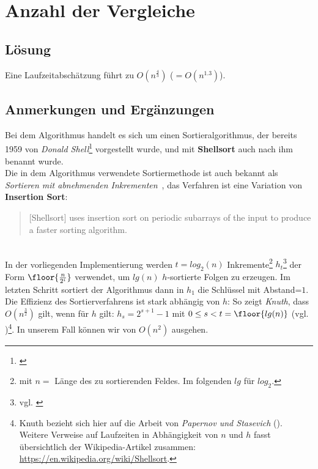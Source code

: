 \chapter{Anzahl der Vergleiche}

\section*{Lösung}

Eine Laufzeitabschätzung führt zu $O(n^{\frac{4}{3}})$ ($ = O(n^{1.3})$).


\section*{Anmerkungen und Ergänzungen}

Bei dem Algorithmus handelt es sich um einen Sortieralgorithmus, der bereits 1959 von \textit{Donald Shell}\footnote{
\cite[]{She59}
} vorgestellt wurde, und mit \textbf{Shellsort} auch nach ihm benannt wurde.\\

Die in dem Algorithmus verwendete Sortiermethode ist auch bekannt als \textit{Sortieren mit abnehmenden Inkrementen}~\cite[88]{OW17b}, das Verfahren ist eine Variation von \textbf{Insertion Sort}:

\blockquote[{\cite[48]{CL22}}]{
    [Shellsort] uses insertion sort on periodic subarrays of the input to produce a faster sorting algorithm.
}\\

In der vorliegenden Implementierung werden $t = log_2(n)$  Inkremente\footnote{
    mit $n =$ Länge des zu sortierenden Feldes. Im folgenden $lg$ für $log_2$.
} $h_t$\footnote{
vgl. \cite[84]{Knu97b}
} der Form $\floor{\frac{n}{2^i}}$ verwendet, um $lg(n)$ $h$-sortierte Folgen zu erzeugen.
Im letzten Schritt sortiert der Algorithmus dann in $h_1$ die Schlüssel mit Abstand=$1$.\\

Die Effizienz des Sortierverfahrens ist stark abhängig von $h$: So zeigt \textit{Knuth}, dass $O(n^{\frac{3}{2}})$ gilt, wenn für $h$ gilt: $h_s = 2^{s+1} - 1$ mit $0 \leq s < t = \floor{lg(n)}$ (vgl. \cite[91]{Knu97b})\footnote{
Knuth bezieht sich hier auf die Arbeit von \textit{Papernov und Stasevich} (\cite[]{PS65}).
Weitere Verweise auf Laufzeiten in Abhängigkeit von $n$ und $h$ fasst übersichtlich der Wikipedia-Artikel zusammen: \url{https://en.wikipedia.org/wiki/Shellsort}.
}. In unserem Fall können wir von $O(n^2)$ ausgehen.
\\
